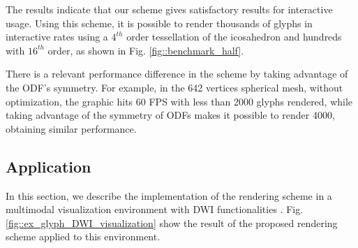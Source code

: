 \documentclass[twoside,twocolumn,10pt]{article}
\begin{document}
The results indicate that our scheme gives satisfactory results for interactive usage. Using this scheme, it is possible to render thousands of glyphs in interactive rates using a $4^{th}$ order tessellation of the icosahedron and hundreds with $16^{th}$ order, as shown in Fig. \ref{fig::benchmark_half}.

There is a relevant performance difference in the scheme by taking advantage of the ODF's symmetry. For example, in the 642 vertices spherical mesh, without optimization, the graphic hits 60 FPS with less than 2000 glyphs rendered, while taking advantage of the symmetry of ODFs makes it possible to render 4000, obtaining similar performance.









\subsection{Application}

In this section, we describe the implementation of the rendering scheme in a multimodal visualization environment with DWI functionalities \cite{VMTKNeuro}. Fig. \ref{fig::ex_glyph_DWI_visualization} show the result of the proposed rendering scheme applied to this environment.
\end{document}
